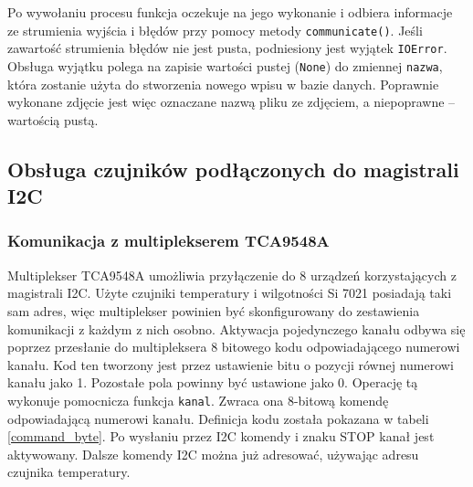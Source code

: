 \documentclass[a4paper,11pt,twoside]{article}
\begin{document}
Po wywołaniu procesu funkcja oczekuje na jego wykonanie i odbiera informacje ze strumienia wyjścia i błędów przy pomocy metody \texttt{communicate()}. Jeśli zawartość strumienia błędów nie jest pusta, podniesiony jest wyjątek \texttt{IOError}. Obsługa wyjątku polega na zapisie wartości pustej (\texttt{None}) do zmiennej \texttt{nazwa}, która zostanie użyta do stworzenia nowego wpisu w bazie danych. Poprawnie wykonane zdjęcie jest więc oznaczane nazwą pliku ze zdjęciem, a niepoprawne -- wartością pustą.
\subsection{Obsługa czujników podłączonych do magistrali I2C}
\subsubsection{Komunikacja z multiplekserem TCA9548A}
Multiplekser TCA9548A umożliwia przyłączenie do 8 urządzeń korzystających z magistrali I2C. Użyte czujniki temperatury i wilgotności Si 7021 posiadają taki sam adres, więc multiplekser powinien być skonfigurowany do zestawienia komunikacji z każdym z nich osobno. Aktywacja pojedynczego kanału odbywa się poprzez przesłanie do multipleksera 8 bitowego kodu odpowiadającego numerowi kanału. Kod ten tworzony jest przez ustawienie bitu o pozycji równej numerowi kanału jako 1. Pozostałe pola powinny być ustawione jako 0. Operację tą wykonuje pomocnicza funkcja \texttt{kanal}. Zwraca ona 8-bitową komendę odpowiadającą numerowi kanału. Definicja kodu została pokazana w tabeli \ref{command_byte}. Po wysłaniu przez I2C komendy i znaku STOP kanał jest aktywowany. Dalsze komendy I2C można już adresować, używając adresu czujnika temperatury.
\end{document}
